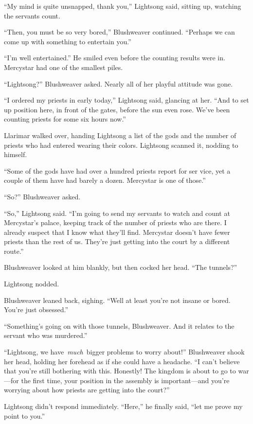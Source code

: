 “My mind is quite unsnapped, thank you,” Lightsong said, sitting up, watching the servants count.

“Then, you must be so very bored,” Blushweaver continued. “Perhaps we can come up with something to entertain you.”

“I’m well entertained.” He smiled even before the counting results were in. Mercystar had one of the smallest piles.

“Lightsong?” Blushweaver asked. Nearly all of her playful attitude was gone.

“I ordered my priests in early today,” Lightsong said, glancing at her. “And to set up position here, in front of the gates, before the sun even rose. We’ve been counting priests for some six hours now.”

Llarimar walked over, handing Lightsong a list of the gods and the number of priests who had entered wearing their colors. Lightsong scanned it, nodding to himself.

“Some of the gods have had over a hundred priests report for ser vice, yet a couple of them have had barely a dozen. Mercystar is one of those.”

“So?” Blushweaver asked.

“So,” Lightsong said. “I’m going to send my servants to watch and count at Mercystar’s palace, keeping track of the number of priests who are there. I already suspect that I know what they’ll find. Mercystar doesn’t have fewer priests than the rest of us. They’re just getting into the court by a different route.”

Blushweaver looked at him blankly, but then cocked her head. “The tunnels?”

Lightsong nodded.

Blushweaver leaned back, sighing. “Well at least you’re not insane or bored. You’re just obsessed.”

“Something’s going on with those tunnels, Blushweaver. And it relates to the servant who was murdered.”

“Lightsong, we have~\textit{much}~bigger problems to worry about!” Blushweaver shook her head, holding her forehead as if she could have a headache. “I can’t believe that you’re still bothering with this. Honestly! The kingdom is about to go to war—for the first time, your position in the assembly is important—and you’re worrying about how priests are getting into the court?”

Lightsong didn’t respond immediately. “Here,” he finally said, “let me prove my point to you.”

